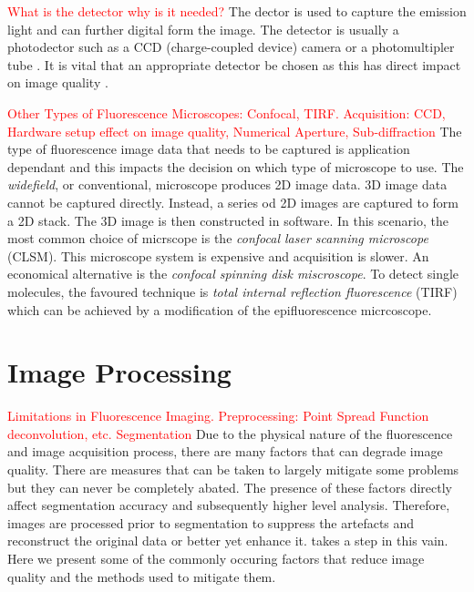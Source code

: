 \begin{definition}[Detector]
	\textcolor{red}{What is the detector why is it needed?}
	The dector is used to capture the emission light and can further digital form the image.
	The detector is usually a photodector such as a CCD (charge-coupled device) camera or a photomultipler tube \citep{Danek2012,Hubeny2008,LichtmanConchello2005,Spring2003,Murphy2001}.
	It is vital that an appropriate detector be chosen as this has direct impact on image quality \citep{Fatima2008}.
\end{definition}

\textcolor{red}{Other Types of Fluorescence Microscopes: Confocal, TIRF. Acquisition: CCD, Hardware setup effect on image quality, Numerical Aperture, Sub-diffraction}
The type of fluorescence image data that needs to be captured is application dependant and this impacts the decision on which type of microscope to use.
The \textit{widefield}, or conventional, microscope produces 2D image data.
3D image data cannot be captured directly.
Instead, a series od 2D images are captured to form a 2D stack. The 3D image is then constructed in software.
In this scenario, the most common choice of micrscope is the \textit{confocal laser scanning microscope} (CLSM).
This microscope system is expensive and acquisition is slower.
An economical alternative is the \textit{confocal spinning disk miscroscope}.
To detect single molecules, the favoured technique is \textit{total internal reflection fluorescence} (TIRF) which can be achieved by a modification of the epifluorescence micrcoscope.


\section{Image Processing}
\label{sec:ImageProcessing}

\textcolor{red}{Limitations in Fluorescence Imaging. Preprocessing: Point Spread Function deconvolution, etc. Segmentation }
Due to the physical nature of the fluorescence and image acquisition process, there are many factors that can degrade image quality.
There are measures that can be taken to largely mitigate some problems but they can never be completely abated.
The presence of these factors directly affect segmentation accuracy and subsequently higher level analysis.
Therefore, images are processed prior to segmentation to suppress the artefacts and reconstruct the original data \citep{Danek2012} or better yet enhance it.
 takes a step in this vain.
Here we present some of the commonly occuring factors that reduce image quality and the methods used to mitigate them.

